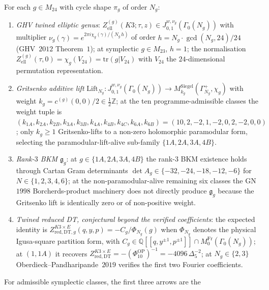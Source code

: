 \begin{theorem}
\label{thm:k3e-twined-26-class-waterfall}
For each $g \in M_{24}$ with cycle shape $\pi_g$ of order $N_g$:
\begin{enumerate}[label=\textup{(\arabic*)}]
\item \emph{GHV twined elliptic genus}: $Z^{(g)}_{\mathrm{ell}}(K3; \tau, z) \in J^{w, \nu_g}_{0, 1}(\Gamma_0(N_g))$ with multiplier $\nu_g(\gamma) = e^{2\pi i \chi_g(\gamma)/(N_g \, h)}$ of order $h = N_g \cdot \gcd(N_g, 24)/24$ (GHV~$2012$ Theorem~$1$); at symplectic $g \in M_{23}$, $h = 1$; the normalisation $Z^{(g)}_{\mathrm{ell}}(\tau, 0) = \chi_g(V_{24}) = \mathrm{tr}(g | V_{24})$ with $V_{24}$ the $24$-dimensional permutation representation.
\item \emph{Gritsenko additive lift} $\mathrm{Lift}_{N_g}: J^{w, \nu_g}_{0, 1}(\Gamma_0(N_g)) \to M^{\mathrm{Siegel}}_{k_g}(\Gamma^+_{N_g}, \chi_g)$ with weight $k_g = c^{(g)}(0, 0)/2 \in \tfrac{1}{2}\mathbb{Z}$; at the ten programme-admissible classes the weight tuple is $(k_{1A}, k_{2A}, k_{2B}, k_{3A}, k_{3B}, k_{4A}, k_{4B}, k_{4C}, k_{6A}, k_{6B}) = (10, 2, -2, 1, -2, 0, 2, -2, 0, 0)$; only $k_g \geq 1$ Gritsenko-lifts to a non-zero holomorphic paramodular form, selecting the paramodular-lift-alive sub-family $\{1A, 2A, 3A, 4B\}$.
\item \emph{Rank-$3$ BKM $\mathfrak{g}_g$}: at $g \in \{1A, 2A, 3A, 4B\}$ the rank-$3$ BKM existence holds through Cartan Gram determinants $\det A_g \in \{-32, -24, -18, -12, -6\}$ for $N \in \{1, 2, 3, 4, 6\}$; at the non-paramodular-alive remaining six classes the GN~$1998$ Borcherds-product machinery does not directly produce $\mathfrak{g}_g$ because the Gritsenko lift is identically zero or of non-positive weight.
\item \emph{Twined reduced DT, conjectural beyond the verified coefficients}: the expected identity is \(Z^{K3 \times E}_{\mathrm{red, DT}, g}(q, y, p) = -C_g / \Phi_{N_g}(g)\) when \(\Phi_{N_g}\) denotes the physical Igusa-square partition form, with \(C_g \in \mathbb{Q}[[q, y^{\pm 1}, p^{\pm 1}]] \cap M^{\mathrm{Fr}}_0(\Gamma_0(N_g))\); at \((1, 1A)\) it recovers \(Z^{K3 \times E}_{\mathrm{red, DT}}=-(\Phi_{10}^{\mathrm{OP}})^{-1}=-4096\,\Delta_5^{-2}\); at \(N_g \in \{2, 3\}\) Oberdieck--Pandharipande~$2019$ verifies the first two Fourier coefficients.
\end{enumerate}
For admissible symplectic classes, the first three arrows are the

\end{theorem}
